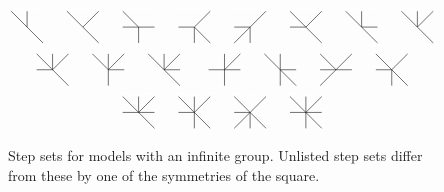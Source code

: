 \begin{figure}[H]
	\centering
	\begin{align*}
		\modelgraph 11000001 \quad \modelgraph 10100001 \quad\modelgraph 10011010  \quad \modelgraph 00110011 &\quad \modelgraph 00110110 \quad \modelgraph 10110001 \quad \modelgraph 11001001 \quad \modelgraph 11100001\\
		\modelgraph 11110001 \quad \modelgraph 11101010 \quad \modelgraph 11101001 \quad\, \quad&\!\exxxx \modelgraph 01111010 \quad \modelgraph 11001011 \quad \modelgraph 10111100 \quad \modelgraph 10110011 \\
		\modelgraph 11111001 \quad \modelgraph 11110011 &\quad \modelgraph 10110111 \quad \modelgraph 11111011
	\end{align*}
	\caption{Step sets for \classic \twoD models with an infinite group. Unlisted step sets differ from these by one of the symmetries of the square.}
\end{figure}

\endinput

